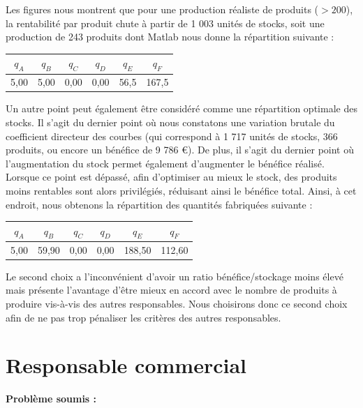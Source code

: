 \documentclass[paper=a4, fontsize=11pt]{report}
\numberwithin{equation}{section}		%
\numberwithin{figure}{section}			%
\numberwithin{table}{section}				%
\renewcommand{\bf}[1]{\textbf{#1}}
\begin{document}
Les figures nous montrent que pour une production réaliste de produits ($> 200$), la rentabilité par produit chute à partir de 1 003 unités de stocks, soit une production de 243 produits dont Matlab nous donne la répartition suivante :

\begin{center}
\begin{tabular}{cccccc}
\hline 
$q_A$ & $q_B$ & $q_C$ & $q_D$ & $q_E$ & $q_F$ \\ 
\hline 
5,00 & 5,00 & 0,00 & 0,00 & 56,5 & 167,5 \\ 
\hline 
\end{tabular} 
\end{center}

Un autre point peut également être considéré comme une répartition optimale des stocks. Il s'agit du dernier point où nous constatons une variation brutale du coefficient directeur des courbes (qui correspond à 1 717 unités de stocks, 366 produits, ou encore un bénéfice de 9 786 €). De plus, il s'agit du dernier point où l'augmentation du stock permet également d'augmenter le bénéfice réalisé. Lorsque ce point est dépassé, afin d'optimiser au mieux le stock, des produits moins rentables sont alors privilégiés, réduisant ainsi le bénéfice total. Ainsi, à cet endroit, nous obtenons la répartition des quantités fabriquées suivante :

\begin{center}
\begin{tabular}{cccccc}
\hline 
$q_A$ & $q_B$ & $q_C$ & $q_D$ & $q_E$ & $q_F$ \\ 
\hline 
5,00 & 59,90 & 0,00 & 0,00 & 188,50 & 112,60 \\ 
\hline 
\end{tabular} 
\end{center}

Le second choix a l'inconvénient d'avoir un ratio bénéfice/stockage moins élevé mais présente l'avantage d'être mieux en accord avec le nombre de produits à produire vis-à-vis des autres responsables. Nous choisirons donc ce second choix afin de ne pas trop pénaliser les critères des autres responsables.

\section{Responsable commercial}
\bf{Problème soumis :}
\end{document}
